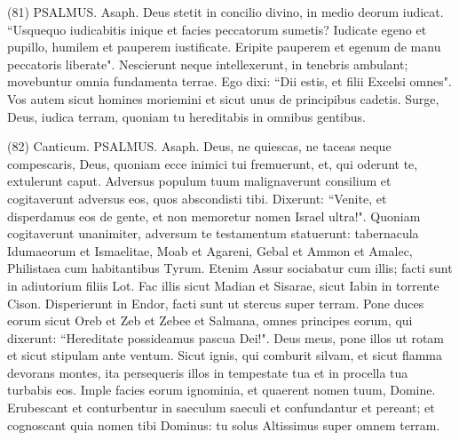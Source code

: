 \begin{biblechapter}  (81) 
\verse  PSALMUS. Asaph. Deus stetit in concilio divino, in medio deorum iudicat. 
\verse “Usquequo iudicabitis inique et facies peccatorum sumetis? 
\verse Iudicate egeno et pupillo, humilem et pauperem iustificate. 
\verse Eripite pauperem et egenum de manu peccatoris liberate". 
\verse Nescierunt neque intellexerunt, in tenebris ambulant; movebuntur omnia fundamenta terrae. 
\verse Ego dixi: “Dii estis, et filii Excelsi omnes". 
\verse Vos autem sicut homines moriemini et sicut unus de principibus cadetis. 
\verse Surge, Deus, iudica terram, quoniam tu hereditabis in omnibus gentibus. 
\end{biblechapter}

\begin{biblechapter}  (82) 
\verse  Canticum. PSALMUS. Asaph. 
\verse Deus, ne quiescas, ne taceas neque compescaris, Deus, 
\verse quoniam ecce inimici tui fremuerunt, et, qui oderunt te, extulerunt caput. 
\verse Adversus populum tuum malignaverunt consilium et cogitaverunt adversus eos, quos abscondisti tibi. 
\verse Dixerunt: “Venite, et disperdamus eos de gente, et non memoretur nomen Israel ultra!". 
\verse Quoniam cogitaverunt unanimiter, adversum te testamentum statuerunt: 
\verse tabernacula Idumaeorum et Ismaelitae, Moab et Agareni, 
\verse Gebal et Ammon et Amalec, Philistaea cum habitantibus Tyrum. 
\verse Etenim Assur sociabatur cum illis; facti sunt in adiutorium filiis Lot. 
\verse Fac illis sicut Madian et Sisarae, sicut Iabin in torrente Cison. 
\verse Disperierunt in Endor, facti sunt ut stercus super terram. 
\verse Pone duces eorum sicut Oreb et Zeb et Zebee et Salmana, omnes principes eorum, 
\verse qui dixerunt: “Hereditate possideamus pascua Dei!". 
\verse Deus meus, pone illos ut rotam et sicut stipulam ante ventum. 
\verse Sicut ignis, qui comburit silvam, et sicut flamma devorans montes, 
\verse ita persequeris illos in tempestate tua et in procella tua turbabis eos. 
\verse Imple facies eorum ignominia, et quaerent nomen tuum, Domine. 
\verse Erubescant et conturbentur in saeculum saeculi et confundantur et pereant; 
\verse et cognoscant quia nomen tibi Dominus: tu solus Altissimus super omnem terram. 
\end{biblechapter}

